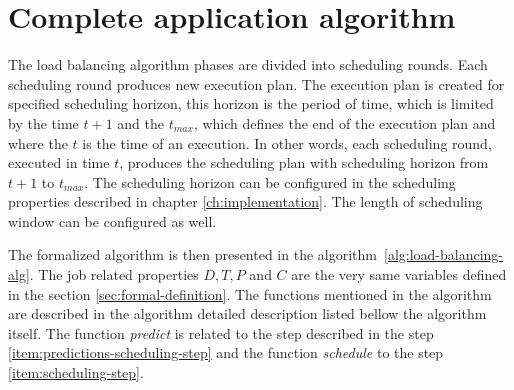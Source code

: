 \section{Complete application algorithm}\label{sec:olb-algorithm}

The load balancing algorithm phases are divided into scheduling rounds.
Each scheduling round produces new execution plan.
The execution plan is created for specified scheduling horizon,
this horizon is the period of time,
which is limited by the time $t+1$ and the $t_{max}$, 
which defines the end of the execution plan
and where the $t$ is the time of an execution.
In other words,
each scheduling round, executed in time $t$,
produces the scheduling plan with scheduling horizon from $t+1$ to $t_{max}$.
The scheduling horizon can be configured in the scheduling properties described in chapter \ref{ch:implementation}.
The length of scheduling window can be configured as well. 

The formalized algorithm is then presented in the algorithm~\ref{alg:load-balancing-alg}.
The job related properties $D,T,P$ and $C$ are the very same variables defined in the section \ref{sec:formal-definition}.
The functions mentioned in the algorithm are described in the algorithm detailed description listed bellow the algorithm itself.
The function \textit{predict} is related to the step described in the step \ref{item:predictions-scheduling-step}
and the function \textit{schedule} to the step \ref{item:scheduling-step}.

